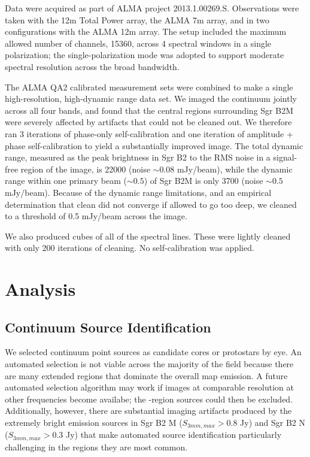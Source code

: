 \newcommand{\ncores}{138\xspace}


Data were acquired as part of ALMA project 2013.1.00269.S.  Observations were
taken with the 12m Total Power array, the ALMA 7m array, and in two
configurations with the ALMA 12m array.  The setup included the maximum allowed
number of channels, 15360, across 4 spectral windows in a single polarization;
the single-polarization mode was adopted to support moderate spectral resolution
across the broad bandwidth.

The ALMA QA2 calibrated measurement sets were combined to make a single
high-resolution, high-dynamic range data set.  We imaged the continuum jointly
across all four bands, and found that the central regions surrounding Sgr B2M
were severely affected by artifacts that could not be cleaned out.  We
therefore ran 3 iterations of phase-only self-calibration and one iteration of
amplitude + phase self-calibration to yield a substantially improved image.
The total dynamic range, measured as the peak brightness in Sgr B2 to the RMS
noise in a signal-free region of the image, is 22000 (noise $\sim0.08$
mJy/beam), while the dynamic range within one primary beam ($\sim0.5$\arcmin)
of Sgr B2M is only 3700 (noise $\sim0.5$ mJy/beam).  Because of the dynamic
range limitations, and an empirical determination that clean did not converge
if allowed to go too deep, we cleaned to a threshold of 0.5 mJy/beam across the
image.

We also produced cubes of all of the spectral lines.  These were lightly cleaned
with only 200 iterations of cleaning.  No self-calibration was applied.

\section{Analysis}

\subsection{Continuum Source Identification}
We selected continuum point sources as candidate cores or protostars by eye.
An automated selection is not viable across the majority of the field because
there are many extended \hii regions that dominate the overall map emission.  A
future automated selection algorithm may work if images at comparable
resolution at other frequencies become availabe; the \hii-region sources could
then be excluded.  Additionally, however, there are substantial imaging
artifacts produced by the extremely bright emission sources in Sgr B2 M ($S_{3
mm,max} > 0.8$ Jy) and Sgr B2 N ($S_{3 mm,max} > 0.3$ Jy) that make automated
source identification particularly challenging in the regions they are most
common.

